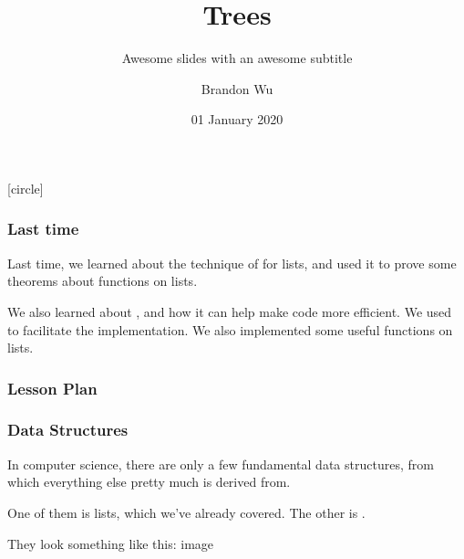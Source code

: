 \documentclass[aspectratio=169]{beamer}
\title{Trees} %
\subtitle{Awesome slides with an awesome subtitle} %
\date{01 January 2020} %
\author{Brandon Wu} %
\newif\ifcolorlambda
\begin{document}
\ifweb
    \renewcommand{\pause}{}
\fi

[circle]

{
\begin{frame}[plain]
    \colorlambdatrue
    \titlepage
\end{frame}
}

\begin{frame}[fragile]
  \frametitle{Last time}

  Last time, we learned about the technique of  for lists, and
  used it to prove some theorems about functions on lists.

  \vspace{\fill}

  We also learned about , and how it can help make code more efficient. We
  used  to facilitate the implementation. We also implemented some useful
  functions on lists.
\end{frame}

\begin{frame}[fragile]
  \frametitle{Lesson Plan}

  \tableofcontents
\end{frame}


\begin{frame}[fragile]
  \frametitle{Data Structures}

  In computer science, there are only a few fundamental data structures, from which everything
  else pretty much is derived from.

  \vspace{\fill}

  One of them is lists, which we've already covered. The other is .

  \vspace{\fill}


  \vspace{\fill}

  They look something like this:
  image
\end{frame}
\end{document}
